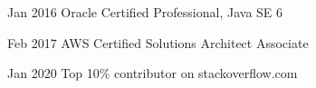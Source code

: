 

\begin{cvskills}

  \cvskill
  {Jan 2016} %
  {Oracle Certified Professional, Java SE 6} %

  \cvskill
  {Feb 2017} %
  {AWS Certified Solutions Architect Associate} %


  \cvskill
  {Jan 2020} %
  {Top 10\% contributor on stackoverflow.com } %

\end{cvskills}
